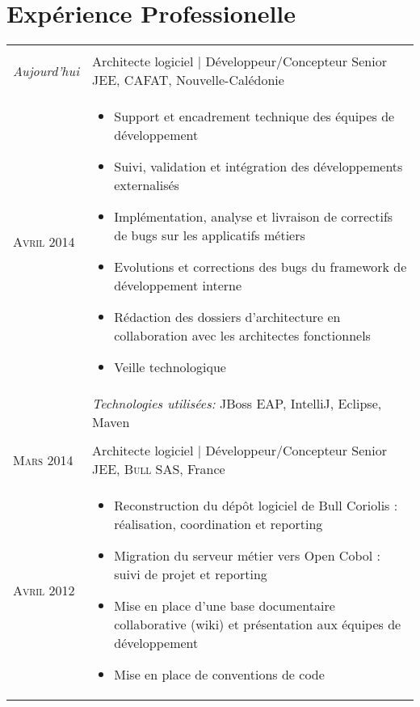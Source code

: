 \section{\texorpdfstring{\color{Blue}Expérience Professionelle}{Expérience Professionelle}}
\begin{longtable}{R{2.5cm}|p{14.8cm}}
   \\
  \emph{Aujourd'hui} & Architecte logiciel | Développeur/Concepteur Senior JEE, \textsc{CAFAT}, Nouvelle-Calédonie\\
  \textsc{Avril 2014} & 
  \vspace{-1em}
  \footnotesize{
    \begin{itemize}
      \item Support et encadrement technique des équipes de développement
      \item Suivi, validation et intégration des développements externalisés
      \item Implémentation, analyse et livraison de correctifs de bugs sur les applicatifs métiers
      \item Evolutions et corrections des bugs du framework de développement interne
      \item Rédaction des dossiers d'architecture en collaboration avec les architectes fonctionnels
      \item Veille technologique
    \end{itemize}
    \vspace{-2em}
  }\\& 
  \footnotesize{\emph{Technologies utilisées:} JBoss EAP, IntelliJ, Eclipse, Maven }\\
  \\
  \textsc{Mars 2014} & Architecte logiciel | Développeur/Concepteur Senior JEE, \textsc{Bull SAS}, France\\
  \textsc{Avril 2012} & 
  \vspace{-1em}
  \footnotesize{
    \begin{itemize}
      \item Reconstruction du dépôt logiciel de Bull Coriolis : réalisation, coordination et reporting
      \item Migration du serveur métier vers Open Cobol : suivi de projet et reporting
      \item Mise en place d'une base documentaire collaborative (wiki) et présentation aux 
      équipes de développement
      \item Mise en place de conventions de code

\end{itemize}}
\end{longtable}
